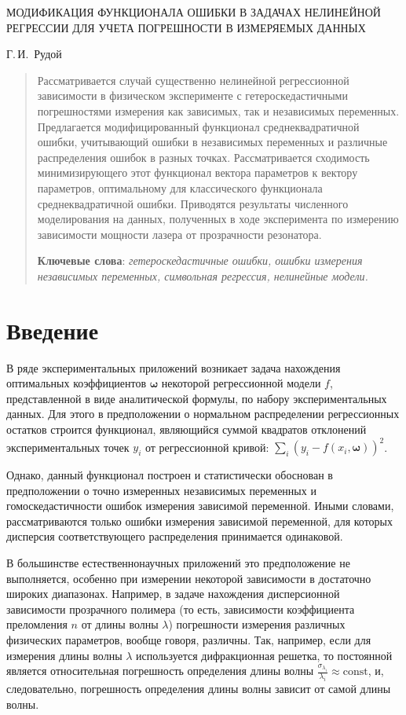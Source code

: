 \documentclass[tikz,11pt,a4paper]{article}
\begin{document}
\begin{center}
  МОДИФИКАЦИЯ ФУНКЦИОНАЛА ОШИБКИ В ЗАДАЧАХ НЕЛИНЕЙНОЙ РЕГРЕССИИ ДЛЯ УЧЕТА ПОГРЕШНОСТИ В ИЗМЕРЯЕМЫХ ДАННЫХ

  \bigskip
  Г.\,И.~Рудой
\end{center}

\begin{abstract}
  Рассматривается случай существенно нелинейной регрессионной зависимости
  в физическом эксперименте с гетероскедастичными погрешностями измерения
  как зависимых, так и независимых переменных.
  Предлагается модифицированный функционал среднеквадратичной ошибки,
  учитывающий ошибки в независимых переменных и различные распределения
  ошибок в разных точках. Рассматривается сходимость минимизирующего этот функционал
  вектора параметров к вектору параметров, оптимальному для классического
  функционала среднеквадратичной ошибки.
  Приводятся результаты численного моделирования на данных, полученных в ходе
  эксперимента по измерению зависимости мощности лазера от прозрачности
  резонатора.

  \textbf{Ключевые слова}: \emph{гетероскедастичные ошибки,
  ошибки измерения независимых переменных, символьная регрессия, нелинейные модели.}
\end{abstract}

\section{Введение}

В ряде экспериментальных приложений возникает задача нахождения оптимальных
коэффициентов $\boldsymbol{\omega}$ некоторой регрессионной модели $f$, представленной в
виде аналитической формулы, по набору экспериментальных данных. Для этого
в предположении о нормальном распределении регрессионных остатков
строится функционал, являющийся суммой квадратов отклонений экспериментальных
точек $y_i$ от регрессионной кривой: $\sum_i (y_i - f(x_i, \boldsymbol{\omega}))^2$.

Однако, данный функционал построен и статистически обоснован в предположении
о точно измеренных независимых переменных и гомоскедастичности ошибок измерения
зависимой переменной. Иными словами, рассматриваются только ошибки измерения
зависимой переменной, для которых дисперсия соответствующего распределения
принимается одинаковой.

В большинстве естественнонаучных приложений это предположение не выполняется,
особенно при измерении некоторой зависимости в достаточно широких диапазонах.
Например, в задаче нахождения дисперсионной зависимости прозрачного
полимера (то есть, зависимости коэффициента преломления $n$ от длины волны
$\lambda$) \cite{Rudoy15MonteCarlo} погрешности измерения
различных физических параметров, вообще говоря, различны. Так, например, если
для измерения длины волны $\lambda$ используется дифракционная решетка, то постоянной
является относительная погрешность определения длины волны
$\frac{\sigma_{\lambda_i}}{\lambda_i} \approx \text{const}$, и, следовательно,
погрешность определения длины волны зависит от самой длины волны.
\end{document}
